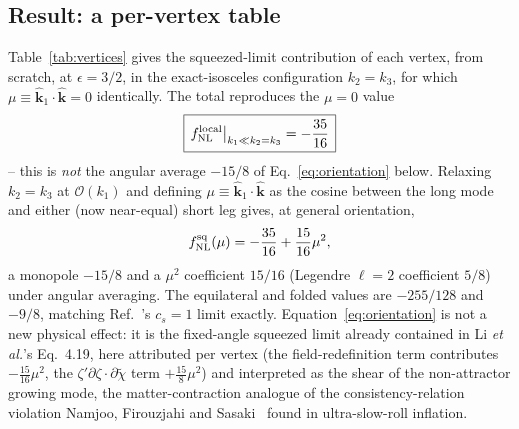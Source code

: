 \documentclass[aps,prd,twocolumn,superscriptaddress,nofootinbib,longbibliography]{revtex4-2}
\begin{document}
\subsection{Result: a per-vertex table}

Table~\ref{tab:vertices} gives the squeezed-limit contribution of each vertex,
from scratch, at $\epsilon=3/2$, in the exact-isosceles configuration
$k_2=k_3$, for which $\mu\equiv\hat{\mathbf k}_1\!\cdot\!\hat{\mathbf k}=0$
identically. The total reproduces the $\mu=0$ value
\begin{equation}
\boxed{\,f_{\rm NL}^{\rm local}\big|_{k_1\ll k_2=k_3}=-\frac{35}{16}\,}
\end{equation}
-- this is \emph{not} the angular average $-15/8$ of
Eq.~\eqref{eq:orientation} below. Relaxing $k_2=k_3$ at $\mathcal O(k_1)$ and
defining $\mu\equiv\hat{\mathbf k}_1\!\cdot\!\hat{\mathbf k}$ as the cosine
between the long mode and either (now near-equal) short leg gives, at general
orientation,
\begin{equation}
f_{\rm NL}^{\rm sq}(\mu)=-\frac{35}{16}+\frac{15}{16}\mu^2,
\label{eq:orientation}
\end{equation}
a monopole $-15/8$ and a $\mu^2$ coefficient $15/16$ (Legendre $\ell=2$
coefficient $5/8$) under angular averaging. The
equilateral and folded values are $-255/128$ and $-9/8$, matching
Ref.~\cite{Li2016}'s $c_s=1$ limit exactly. Equation~\eqref{eq:orientation} is
not a new physical effect: it is the fixed-angle squeezed limit already
contained in Li \textit{et al.}'s Eq.~4.19, here attributed per vertex (the
field-redefinition term contributes $-\tfrac{15}{16}\mu^2$, the
$\zeta'\partial\zeta\!\cdot\!\partial\tilde\chi$ term $+\tfrac{15}{8}\mu^2$) and
interpreted as the shear of the non-attractor growing mode, the matter-contraction
analogue of the consistency-relation violation Namjoo, Firouzjahi and
Sasaki~\cite{Namjoo2012} found in ultra-slow-roll inflation.
\end{document}
